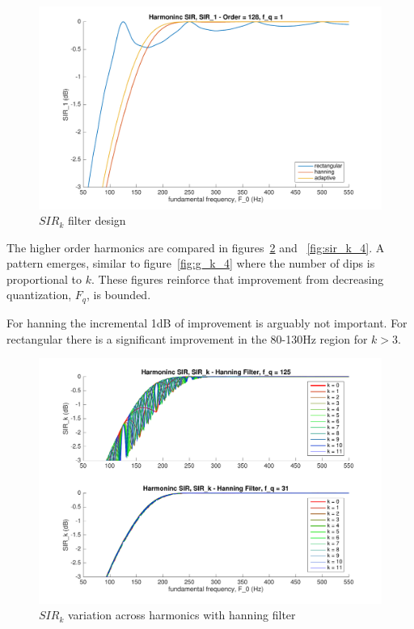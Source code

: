 \documentclass [11pt, proquest,oneside] {ganter_thesis}[2015/03/03]
\begin{document}
\begin{figure}[!ht]
  \centering
    \includegraphics[width=1\textwidth]{sir_k_2}
    \caption{$SIR_k$ filter design}\label{fig:sir_k_2}
\end{figure}

The higher order harmonics are compared in figures~\ref{fig:sir_k_3} and ~\ref{fig:sir_k_4}.  A pattern emerges, similar to figure~\ref{fig:g_k_4} where the number of dips is proportional to $k$.  These figures reinforce that improvement from decreasing quantization, $F_q$, is bounded.

For hanning the incremental 1dB of improvement is arguably not important.  For rectangular there is a significant improvement in the 80-130Hz region for $k > 3$.

\begin{figure}[!ht]
  \centering
    \includegraphics[width=.7\textwidth]{sir_k_3}
    \caption{$SIR_k$ variation across harmonics with hanning filter}\label{fig:sir_k_3}
\end{figure}
\end{document}
